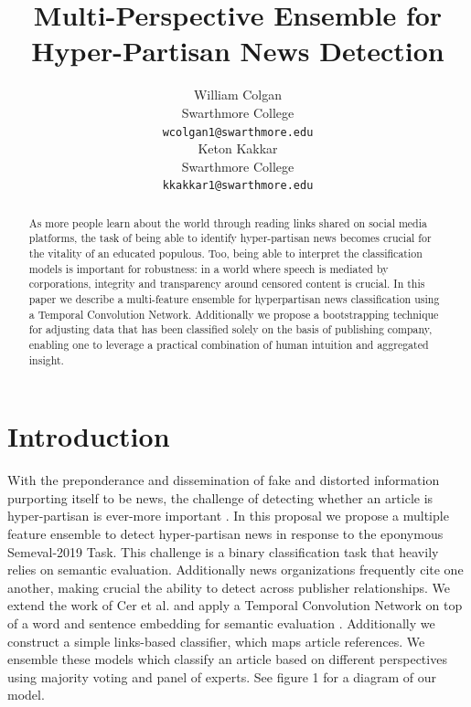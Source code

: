 \documentclass[11pt,a4paper]{article}
\title{Multi-Perspective Ensemble for Hyper-Partisan News Detection}
\author{William Colgan \\
  Swarthmore College \\
  {\tt wcolgan1@swarthmore.edu} \\ \And
  Keton Kakkar \\
  Swarthmore College \\
  {\tt kkakkar1@swarthmore.edu} \\}
\date{}
\begin{document}
\maketitle
\begin{abstract}
  As more people learn about the world through reading links shared on social media platforms, the task of being able to identify hyper-partisan news becomes crucial for the vitality of an educated populous. Too, being able to interpret the classification models is important for robustness: in a world where speech is mediated by corporations, integrity and transparency around censored content is crucial. In this paper we describe a multi-feature ensemble for hyperpartisan news classification using a Temporal Convolution Network. Additionally we propose a bootstrapping technique for adjusting data that has been classified solely on the basis of publishing company, enabling one to leverage a practical combination of human intuition and aggregated insight. 
\end{abstract}

\section{Introduction}
With the preponderance and dissemination of fake and distorted information purporting itself to be news, the challenge of detecting whether an article is hyper-partisan is ever-more important \citep{DBLP:journals/corr/HorneA17}. In this proposal we propose a multiple feature ensemble to detect hyper-partisan news in response to the eponymous Semeval-2019 Task. This challenge is a binary classification task that heavily relies on semantic evaluation. Additionally news organizations frequently cite one another, making crucial the ability to detect across publisher relationships. We extend the work of Cer et al. and apply a Temporal Convolution Network on top of a word and sentence embedding for semantic evaluation \citep{DBLP:journals/corr/abs-1803-11175}. Additionally we construct a simple links-based classifier, which maps article references. We ensemble these models which classify an article based on different perspectives using majority voting and panel of experts. See figure 1 for a diagram of our model.
\end{document}
